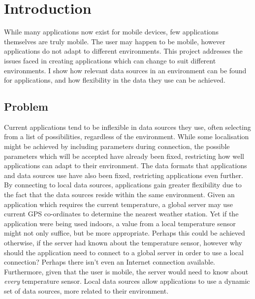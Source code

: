 \documentclass[12pt,twoside,notitlepage]{report}
\begin{document}
\bigskip
\bigskip
{}

\cleardoublepage

\tableofcontents

\listoffigures

\newpage


\cleardoublepage        %

\setcounter{page}{1}
\pagestyle{headings}

\chapter{Introduction}

While many applications now exist for mobile devices, few applications themselves are truly mobile. 
The user may happen to be mobile, however applications do not adapt to different environments. 
This project addresses the issues faced in creating applications which can change to suit different environments. 
I show how relevant data sources in an environment can be found for applications, and how flexibility in the data they use can be achieved. 

\section{Problem}

Current applications tend to be inflexible in data sources they use, often selecting from a list of possibilities, regardless of the environment. 
While some localisation might be achieved by including parameters during connection, the possible parameters which will be accepted have already been fixed, restricting how well applications can adapt to their environment. 
The data formats that applications and data sources use have also been fixed, restricting applications even further.
By connecting to local data sources, applications gain greater flexibility due to the fact that the data sources reside within the same environment.
Given an application which requires the current temperature, a global server may use current GPS co-ordinates to determine the nearest weather station. 
Yet if the application were being used indoors, a value from a local temperature sensor might not only suffice, but be more appropriate. 
Perhaps this could be achieved otherwise, if the server had known about the temperature sensor, however why should the application need to connect to a global server in order to use a local connection? Perhaps there isn't even an Internet connection available. 
Furthermore, given that the user is mobile, the server would need to know about {\sl every} temperature sensor. 
Local data sources allow applications to use a dynamic set of data sources, more related to their environment. 
\end{document}
